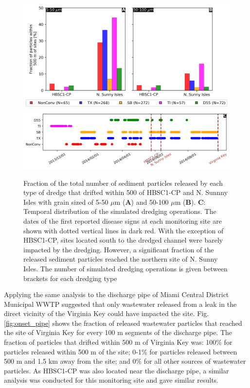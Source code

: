 \documentclass[preprint,12pt,authoryear]{elsarticle}
\begin{document}
\begin{figure}
	\centering
	\includegraphics[width=\textwidth]{figures/aggregated_new.png}
	\includegraphics[width=\textwidth]{figures/timeline.png}
	\caption{Fraction of the total number of sediment particles released by each type of dredge that drifted within 500 of HBSC1-CP and N. Sunnny Isles with grain sized of 5-50 $\mu$m (\textbf{A}) and 50-100 $\mu$m (\textbf{B}). \textbf{C}: Temporal distribution of the simulated dredging operations. The dates of the first reported disease signs at each monitoring site are shown with dotted vertical lines in dark red. With the exception of HBSC1-CP, sites located south to the dredged channel were barely impacted by the dredging. However, a significant fraction of the released sediment particles reached the northern site of N. Sunny Isles. The number of simulated dredging operations is given between brackets for each dredging type}
	\label{fig:onset_bar}
\end{figure}

Applying the same analysis to the discharge pipe of Miami Central District Municipal WWTP suggested that only wastewater released from a leak in the direct vicinity of the Virginia Key could have impacted the site. Fig. \ref{fig:onset_pipe} shows the fraction of released wastewater particles that reached the site of Virginia Key for every 100 m segments of the discharge pipe. The fraction of particles that drifted within 500 m of Virginia Key was: 100\% for particles released within 500 m of the site; 0-1\% for particles released between 500 m and 1.5 km away from the site; and 0\% for all other sources of wastewater particles. As HBSC1-CP was also located near the discharge pipe, a similar analysis was conducted for this monitoring site and gave similar results.
\end{document}
